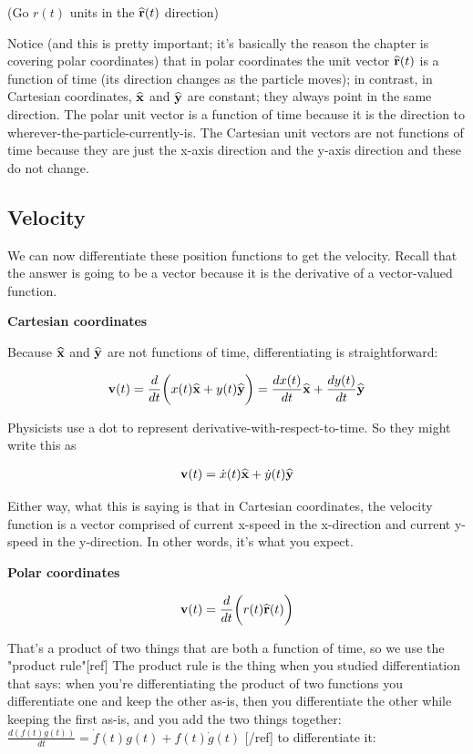 (Go $r(t)$ units in the $\mathbf{\widehat{r}}(t)$ direction)


Notice (and this is pretty important; it's basically the reason the chapter is
covering polar coordinates) that in polar coordinates the unit vector
$\mathbf{\widehat{r}}(t)$ is a function of time (its direction changes as the particle moves);
in contrast, in Cartesian coordinates, $\mathbf{\widehat{x}}$ and $\mathbf{\widehat{y}}$ are constant; they
always point in the same direction. The polar unit vector is a function of time
because it is the direction to wherever-the-particle-currently-is. The
Cartesian unit vectors are not functions of time because they are just the
x-axis direction and the y-axis direction and these do not change.

\subsection{Velocity}


We can now differentiate these position functions to get the velocity. Recall
that the answer is going to be a vector because it is the derivative of a
vector-valued function.

\textbf{Cartesian coordinates}

Because $\mathbf{\widehat{x}}$ and $\mathbf{\widehat{y}}$ are not functions of time, differentiating is
straightforward:

\begin{align*}
\mathbf v(t) = \frac{d}{dt}\bigg(x(t)\mathbf{\widehat{x}} + y(t)\mathbf{\widehat{y}}\bigg) = \frac{d x(t)}{dt}\mathbf{\widehat{x}} + \frac{d y(t)}{dt} \mathbf{\widehat{y}}
\end{align*}

Physicists use a dot to represent derivative-with-respect-to-time. So they
might write this as

\begin{align*}
\mathbf v(t) =  \dot x(t) \mathbf{\widehat{x}} + \dot y(t) \mathbf{\widehat{y}}
\end{align*}

Either way, what this is saying is that in Cartesian coordinates, the velocity
function is a vector comprised of current x-speed in the x-direction and
current y-speed in the y-direction. In other words, it's what you expect.

\textbf{Polar coordinates}

\begin{align*}
\mathbf v(t) = \frac{d}{dt}\bigg(r(t)\mathbf{\widehat{r}}(t)\bigg)
\end{align*}

That's a product of two things that are both a function of time, so we use the
"product rule"[ref] The product rule is the thing when you studied
differentiation that says: when you're differentiating the product of two
functions you differentiate one and keep the other as-is, then you
differentiate the other while keeping the first as-is, and you add the two
things together: $\frac{d(f(t)g(t))}{dt} = \dot f(t) g(t) + f(t) \dot g(t)$
[/ref] to differentiate it:

